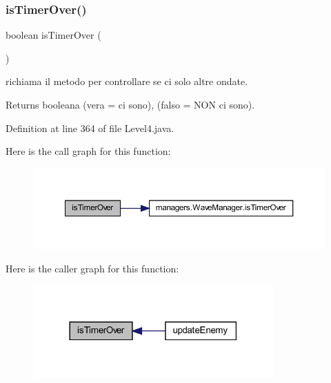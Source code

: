 \subsubsection{\texorpdfstring{is\+Timer\+Over()}{isTimerOver()}}
{\footnotesize\ttfamily boolean is\+Timer\+Over (\begin{DoxyParamCaption}{ }\end{DoxyParamCaption})\hspace{0.3cm}{\ttfamily [private]}}



richiama il metodo per controllare se ci solo altre ondate. 

\begin{DoxyReturn}{Returns}
booleana (vera = ci sono), (falso = N\+ON ci sono). 
\end{DoxyReturn}


Definition at line 364 of file Level4.\+java.

Here is the call graph for this function\+:
\nopagebreak
\begin{figure}[H]
\begin{center}
\leavevmode
\includegraphics[width=350pt]{classscenes_1_1_level4_ab68417e6738c05037923f5f0f21eb586_cgraph}
\end{center}
\end{figure}
Here is the caller graph for this function\+:\nopagebreak
\begin{figure}[H]
\begin{center}
\leavevmode
\includegraphics[width=261pt]{classscenes_1_1_level4_ab68417e6738c05037923f5f0f21eb586_icgraph}
\end{center}
\end{figure}
\mbox{\label{classscenes_1_1_level4_aa12eb1084be2c4d9b03d5f248f00900d}} 
